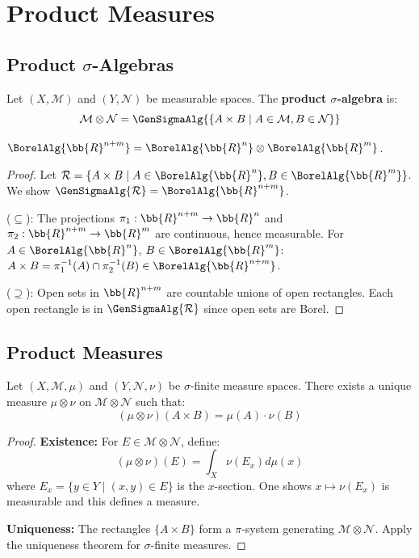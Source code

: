 \chapter{Product Measures}

\section{Product $\sigma$-Algebras}

\begin{definition}
Let $(X, \mathcal{M})$ and $(Y, \mathcal{N})$ be measurable spaces. The \textbf{product $\sigma$-algebra} is:
\[ \mathcal{M} \otimes \mathcal{N} = \GenSigmaAlg{\{A \times B \mid A \in \mathcal{M}, B \in \mathcal{N}\}} \]
\end{definition}

\begin{proposition}
$\BorelAlg{\bb{R}^{n+m}} = \BorelAlg{\bb{R}^n} \otimes \BorelAlg{\bb{R}^m}$.
\end{proposition}

\begin{proof}
Let $\mathcal{R} = \{A \times B \mid A \in \BorelAlg{\bb{R}^n}, B \in \BorelAlg{\bb{R}^m}\}$. We show $\GenSigmaAlg{\mathcal{R}} = \BorelAlg{\bb{R}^{n+m}}$.

($\subseteq$): The projections $\pi_1: \bb{R}^{n+m} \to \bb{R}^n$ and $\pi_2: \bb{R}^{n+m} \to \bb{R}^m$ are continuous, hence measurable. For $A \in \BorelAlg{\bb{R}^n}$, $B \in \BorelAlg{\bb{R}^m}$: $A \times B = \pi_1^{-1}(A) \cap \pi_2^{-1}(B) \in \BorelAlg{\bb{R}^{n+m}}$.

($\supseteq$): Open sets in $\bb{R}^{n+m}$ are countable unions of open rectangles. Each open rectangle is in $\GenSigmaAlg{\mathcal{R}}$ since open sets are Borel.
\end{proof}

\section{Product Measures}

\begin{theorem}
Let $(X, \mathcal{M}, \mu)$ and $(Y, \mathcal{N}, \nu)$ be $\sigma$-finite measure spaces. There exists a unique measure $\mu \otimes \nu$ on $\mathcal{M} \otimes \mathcal{N}$ such that:
\[ (\mu \otimes \nu)(A \times B) = \mu(A) \cdot \nu(B) \]
\end{theorem}

\begin{proof}
\textbf{Existence:} For $E \in \mathcal{M} \otimes \mathcal{N}$, define:
\[ (\mu \otimes \nu)(E) = \int_X \nu(E_x) d\mu(x) \]
where $E_x = \{y \in Y \mid (x, y) \in E\}$ is the $x$-section. One shows $x \mapsto \nu(E_x)$ is measurable and this defines a measure.

\textbf{Uniqueness:} The rectangles $\{A \times B\}$ form a $\pi$-system generating $\mathcal{M} \otimes \mathcal{N}$. Apply the uniqueness theorem for $\sigma$-finite measures.
\end{proof}

